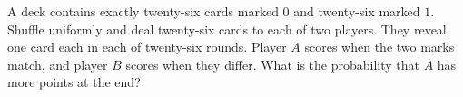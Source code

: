 A deck contains exactly twenty-six cards marked $0$ and twenty-six marked $1$. Shuffle uniformly and deal twenty-six cards to each of two players. They reveal one card each in each of twenty-six rounds. Player $A$ scores when the two marks match, and player $B$ scores when they differ. What is the probability that $A$ has more points at the end?
